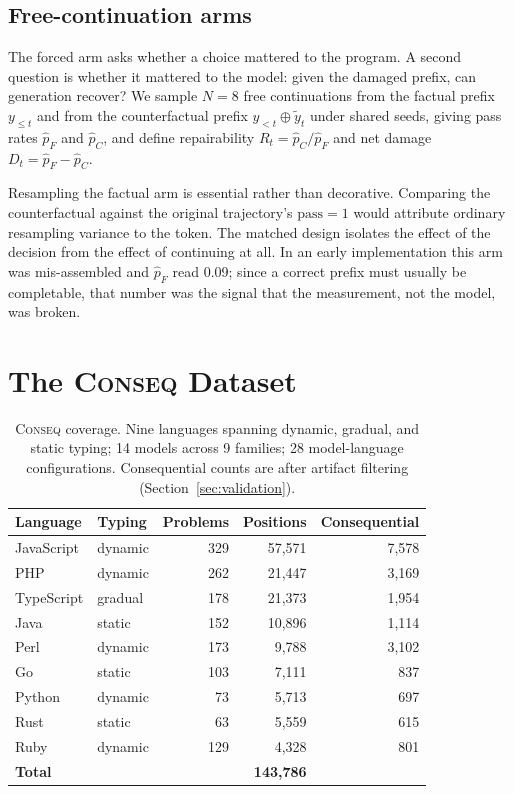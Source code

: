 \documentclass[twoside,11pt]{article}
\begin{document}
\subsection{Free-continuation arms}

The forced arm asks whether a choice mattered to the program. A second question is whether it
mattered to the model: given the damaged prefix, can generation recover? We sample $N=8$ free
continuations from the factual prefix $y_{\leq t}$ and from the counterfactual prefix
$y_{<t} \oplus \tilde{y}_t$ under shared seeds, giving pass rates $\hat{p}_F$ and $\hat{p}_C$, and
define repairability $R_t = \hat{p}_C / \hat{p}_F$ and net damage $D_t = \hat{p}_F - \hat{p}_C$.

Resampling the factual arm is essential rather than decorative. Comparing the counterfactual
against the original trajectory's $\mathrm{pass} = 1$ would attribute ordinary resampling variance
to the token. The matched design isolates the effect of the decision from the effect of continuing
at all. In an early implementation this arm was mis-assembled and $\hat{p}_F$ read 0.09; since a
correct prefix must usually be completable, that number was the signal that the measurement, not
the model, was broken.

\section{The \textsc{Conseq} Dataset}

\begin{table}[t]
\centering
\begin{tabular}{llrrr}
\toprule
Language & Typing & Problems & Positions & Consequential \\
\midrule
JavaScript & dynamic & 329 & 57,571 & 7,578 \\
PHP        & dynamic & 262 & 21,447 & 3,169 \\
TypeScript & gradual & 178 & 21,373 & 1,954 \\
Java       & static  & 152 & 10,896 & 1,114 \\
Perl       & dynamic & 173 &  9,788 & 3,102 \\
Go         & static  & 103 &  7,111 &   837 \\
Python     & dynamic &  73 &  5,713 &   697 \\
Rust       & static  &  63 &  5,559 &   615 \\
Ruby       & dynamic & 129 &  4,328 &   801 \\
\midrule
\multicolumn{2}{l}{\textbf{Total}} & & \textbf{143,786} & \\
\bottomrule
\end{tabular}
\caption{\textsc{Conseq} coverage. Nine languages spanning dynamic, gradual, and static typing;
14 models across 9 families; 28 model-language configurations. Consequential counts are after
artifact filtering (Section~\ref{sec:validation}).}
\label{tab:coverage}
\end{table}
\end{document}
